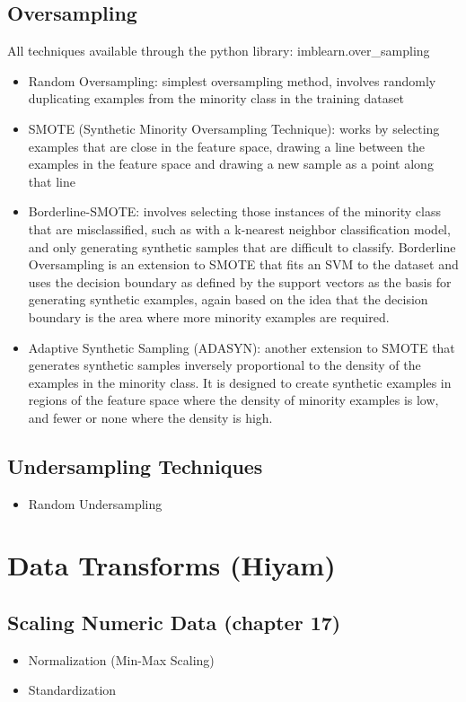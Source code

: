 \documentclass{article}
\begin{document}
\subsection{Oversampling}
All techniques available through the python library: imblearn.over\_sampling

\begin{itemize}
    \item Random Oversampling: simplest oversampling method, involves randomly duplicating examples from the minority class in the training dataset
    \item SMOTE (Synthetic Minority Oversampling Technique): works by selecting examples that are close in the feature space, drawing a line between the examples in the feature space and drawing a new sample as a point along that line
    \item Borderline-SMOTE: involves selecting those instances of the minority class that are misclassified, such as with a k-nearest neighbor classification model, and only generating synthetic samples that are difficult to classify. Borderline Oversampling is an extension to SMOTE that fits an SVM to the dataset and uses the decision boundary as defined by the support vectors as the basis for generating synthetic examples, again based on the idea that the decision boundary is the area where more minority examples are required.
    \item Adaptive Synthetic Sampling (ADASYN): another extension to SMOTE that generates synthetic samples inversely proportional to the density of the examples in the minority class. It is designed to create synthetic examples in regions of the feature space where the density of minority examples is low, and fewer or none where the density is high.
\end{itemize}
\subsection{Undersampling Techniques}
\begin{itemize}
    \item Random Undersampling
\end{itemize}
\section{Data Transforms (Hiyam)}
\subsection{Scaling Numeric Data (chapter 17)}
\begin{itemize}
\item Normalization (Min-Max Scaling)
\item Standardization
\end{itemize}
\end{document}
